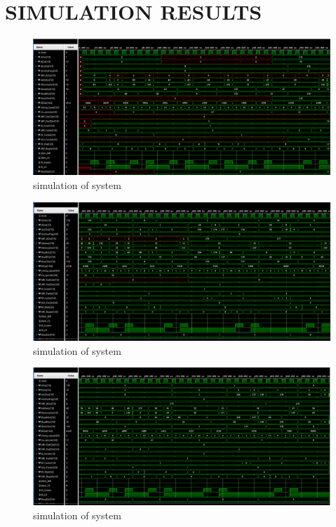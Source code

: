 \documentclass[pdftex,12pt,a4paper]{article}
\begin{document}
\section{SIMULATION RESULTS}


\begin{figure}[H]
    \centering
    \includegraphics[width=1\textwidth]{photos/system_result_1.png}	
    \caption{simulation of system}
    \label{implementation}
\end{figure}


\begin{figure}[H]
    \centering
    \includegraphics[width=1\textwidth]{photos/system_result_2.png}	
    \caption{simulation of system}
    \label{implementation}
\end{figure}


\begin{figure}[H]
    \centering
    \includegraphics[width=1\textwidth]{photos/system_result_3.png}	
    \caption{simulation of system}
    \label{implementation}
\end{figure}
\end{document}
